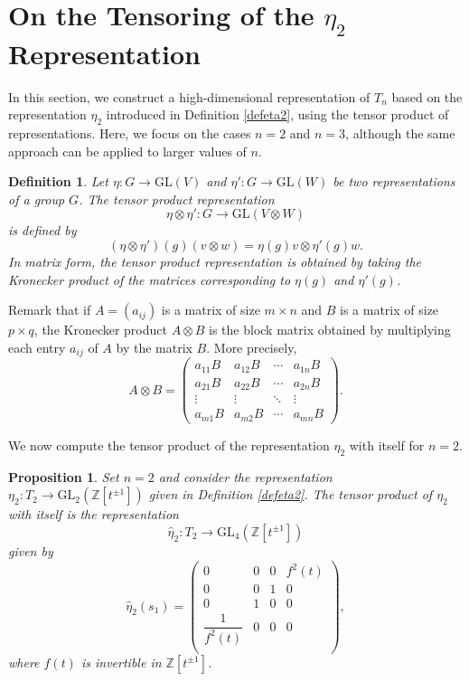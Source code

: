 \documentclass[reqno]{amsart}
\newtheorem{definition}[theorem]{Definition}
\newtheorem{proposition}[theorem]{Proposition}
\begin{document}
\section{On the Tensoring of the $\eta_2$ Representation}

In this section, we construct a high-dimensional representation of $T_n$ based on the representation $\eta_2$ introduced in Definition \ref{defeta2}, using the tensor product of representations. Here, we focus on the cases $n=2$ and $n=3$, although the same approach can be applied to larger values of $n$.

\begin{definition}
Let $\eta: G\to \mathrm{GL}(V)$ and $\eta': G\to \mathrm{GL}(W)$ be two representations of a group $G$. The tensor product representation
\[
\eta\otimes\eta' : G\to \mathrm{GL}(V\otimes W)
\]
is defined by
\[
(\eta\otimes\eta')(g)(v\otimes w)=\eta(g)v\otimes\eta'(g)w.
\]
In matrix form, the tensor product representation is obtained by taking the Kronecker product of the matrices corresponding to $\eta(g)$ and $\eta'(g)$.
\end{definition}

Remark that if $A=(a_{ij})$ is a matrix of size $m\times n$ and $B$ is a matrix of size $p\times q$, the Kronecker product $A\otimes B$ is the block matrix obtained by multiplying each entry $a_{ij}$ of $A$ by the matrix $B$. More precisely,
\[
A\otimes B=
\begin{pmatrix}
a_{11}B & a_{12}B & \cdots & a_{1n}B\\
a_{21}B & a_{22}B & \cdots & a_{2n}B\\
\vdots & \vdots & \ddots & \vdots\\
a_{m1}B & a_{m2}B & \cdots & a_{mn}B
\end{pmatrix}.
\]

We now compute the tensor product of the representation $\eta_2$ with itself for $n=2$.

\begin{proposition} \label{firstprop}
Set $n=2$ and consider the representation $\eta_2:T_2 \longrightarrow \mathrm{GL}_2(\mathbb{Z}[t^{\pm 1}])$ given in Definition \ref{defeta2}. The tensor product of $\eta_2$ with itself is the representation $$\hat{\eta}_2:T_2 \longrightarrow \mathrm{GL}_4(\mathbb{Z}[t^{\pm 1}])$$ given by
$$
\hat{\eta}_2(s_1)=
\left( \begin{matrix}
0 & 0 & 0 & f^2(t)\\
0 & 0 & 1 & 0\\
0 & 1 & 0 & 0\\
\dfrac{1}{f^2(t)} & 0 & 0 & 0\\
\end{matrix}\right),$$
where $f(t)$ is invertible in $ \mathbb{Z}[t^{\pm 1}]$.
\end{proposition}
\end{document}
